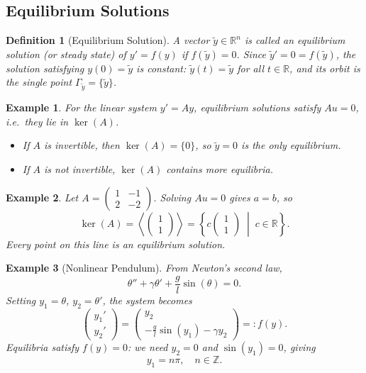 \documentclass{article}
\newtheorem{definition}{Definition}
\newtheorem*{example}{Example}
\newcommand{\R}{\mathbb{R}}
\begin{document}
\subsection{Equilibrium Solutions}

\begin{definition}[Equilibrium Solution]
    A vector $\tilde{y} \in \R^n$ is called an \emph{equilibrium solution} (or steady state) of $y' = f(y)$ if $f(\tilde{y}) = 0$. Since $\tilde{y}' = 0 = f(\tilde{y})$, the solution satisfying $y(0) = \tilde{y}$ is constant: $\tilde{y}(t) = \tilde{y}$ for all $t \in \R$, and its orbit is the single point $\Gamma_{\tilde{y}} = \{\tilde{y}\}$.
\end{definition}

\begin{example}
    For the linear system $y' = Ay$, equilibrium solutions satisfy $Au = 0$, i.e.\ they lie in $\ker(A)$.
    \begin{itemize}
        \item If $A$ is invertible, then $\ker(A) = \{0\}$, so $\tilde{y} = 0$ is the only equilibrium.
        \item If $A$ is not invertible, $\ker(A)$ contains more equilibria.
    \end{itemize}
\end{example}

\begin{example}
    Let $A = \begin{pmatrix}1&-1\\2&-2\end{pmatrix}$. Solving $Au = 0$ gives $a = b$, so
    \[\ker(A) = \left\langle\begin{pmatrix}1\\1\end{pmatrix}\right\rangle = \left\{c\begin{pmatrix}1\\1\end{pmatrix} \;\middle|\; c\in\R\right\}.\]
    Every point on this line is an equilibrium solution.
\end{example}

\begin{example}[Nonlinear Pendulum]
    From Newton's second law,
    \[\theta'' + \gamma\theta' + \frac{g}{l}\sin(\theta) = 0.\]
    Setting $y_1 = \theta$, $y_2 = \theta'$, the system becomes
    \[\begin{pmatrix}y_1'\\y_2'\end{pmatrix} = \begin{pmatrix}y_2\\-\tfrac{g}{l}\sin(y_1) - \gamma y_2\end{pmatrix} =: f(y).\]
    Equilibria satisfy $f(y) = 0$: we need $y_2 = 0$ and $\sin(y_1) = 0$, giving
    \[y_1 = n\pi,\quad n \in \mathbb{Z}.\]
\end{example}
\end{document}

